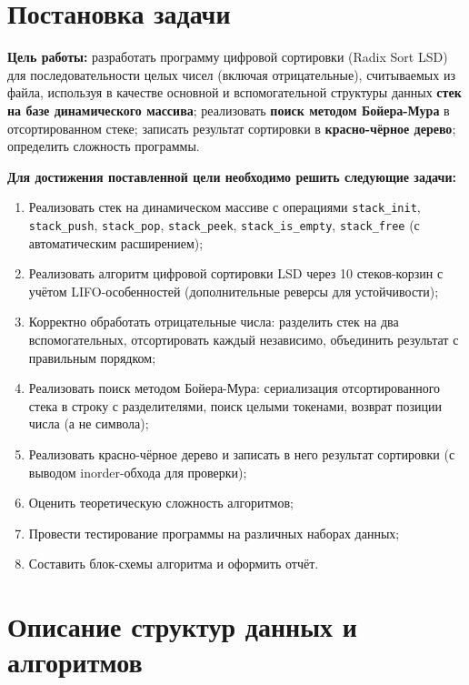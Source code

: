 \documentclass[a4paper,14pt]{extarticle}
\begin{document}
\section{Постановка задачи}

\textbf{Цель работы:} разработать программу цифровой сортировки (Radix Sort LSD) для последовательности целых чисел (включая отрицательные), считываемых из файла, используя в качестве основной и вспомогательной структуры данных \textbf{стек на базе динамического массива}; реализовать \textbf{поиск методом Бойера-Мура} в отсортированном стеке; записать результат сортировки в \textbf{красно-чёрное дерево}; определить сложность программы.

\vspace{0.5cm}
\textbf{Для достижения поставленной цели необходимо решить следующие задачи:}
\begin{enumerate}
  \item Реализовать стек на динамическом массиве с операциями \texttt{stack\_init}, \texttt{stack\_push}, \texttt{stack\_pop}, \texttt{stack\_peek}, \texttt{stack\_is\_empty}, \texttt{stack\_free} (с автоматическим расширением);
  \item Реализовать алгоритм цифровой сортировки LSD через 10 стеков-корзин с учётом LIFO-особенностей (дополнительные реверсы для устойчивости);
  \item Корректно обработать отрицательные числа: разделить стек на два вспомогательных, отсортировать каждый независимо, объединить результат с правильным порядком;
  \item Реализовать поиск методом Бойера-Мура: сериализация отсортированного стека в строку с разделителями, поиск целыми токенами, возврат позиции числа (а не символа);
  \item Реализовать красно-чёрное дерево и записать в него результат сортировки (с выводом inorder-обхода для проверки);
  \item Оценить теоретическую сложность алгоритмов;
  \item Провести тестирование программы на различных наборах данных;
  \item Составить блок-схемы алгоритма и оформить отчёт.
\end{enumerate}

\newpage
\section{Описание структур данных и алгоритмов}
\end{document}
